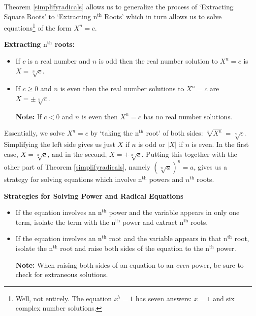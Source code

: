 Theorem \ref{simplifyradicals} allows us to generalize the process of `Extracting Square Roots' to `Extracting $\text{n}^{\text{th}}$ Roots' which in turn allows us to solve equations\footnote{Well, not entirely.  The equation $x^{7} = 1$ has seven answers: $x = 1$ and six complex number solutions. } of the form $X^n  = c$.

\label{extractingnthroots}

\medskip

\colorbox{ResultColor}{\bbm

\centerline{\textbf{Extracting $\text{n}^{\text{th}}$ roots:}}

\begin{itemize}

\item If $c$ is a real number and $n$ is odd then the real number solution to $X^{n} = c$ is $X = \sqrt[n]{c}$.

\item  If $c \geq 0$ and $n$ is even then the real number solutions to $X^{n} = c$ are $X = \pm \sqrt[n]{c}$.

\textbf{Note:} If $c < 0$ and $n$ is even then $X^{n} = c$ has no real number solutions.

\end{itemize}

\ebm}

\medskip

Essentially, we solve $X^{n} = c$ by `taking the $\text{n}^{\text{th}}$ root' of both sides:  $\sqrt[n]{X^{n}} = \sqrt[n]{c}$. Simplifying the left side gives us just $X$ if $n$ is odd or $|X|$ if $n$ is even.  In the first case,  $X =  \sqrt[n]{c}$, and in the second, $X = \pm \sqrt[n]{c}$.  Putting this together with the other part of Theorem \ref{simplifyradicals}, namely $(\sqrt[n]{a})^n = a$, gives us a strategy for solving equations which involve $\text{n}^{\text{th}}$ powers and $n^{\text{th}}$ roots. 

\label{solvepowerandradicaleqns}

\medskip

\colorbox{ResultColor}{\bbm
\centerline{\textbf{Strategies for Solving Power and Radical Equations}}

\begin{itemize}

\item  If the equation involves an $\text{n}^{\text{th}}$ power and the variable appears in only one term, isolate the term with the $\text{n}^{\text{th}}$ power and extract $\text{n}^{\text{th}}$ roots.

\item  If the equation involves an $\text{n}^{\text{th}}$ root and the variable appears in that $\text{n}^{\text{th}}$ root, isolate the $\text{n}^{\text{th}}$ root and raise both sides of the equation to the $\text{n}^{\text{th}}$ power.

\textbf{Note:}  When raising both sides of an equation to an \textit{even} power, be sure to check for extraneous solutions.

\end{itemize}

\ebm}

